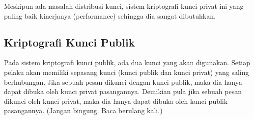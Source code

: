 Meskipun ada masalah distribusi kunci, sistem kriptografi kunci privat ini yang
paling baik kinerjanya (performance) sehingga dia sangat dibutuhkan.


\subsection{Kriptografi Kunci Publik}
Pada sistem kriptografi kunci publik, ada dua kunci yang akan digunakan. Setiap
pelaku akan memiliki sepasang kunci (kunci publik dan kunci privat) yang saling
berhubungan. Jika sebuah pesan dikunci dengan kunci publik, maka dia hanya
dapat dibuka oleh kunci privat pasangannya. Demikian pula jika sebuah pesan
dikunci oleh kunci privat, maka dia hanya dapat dibuka oleh kunci publik
pasangannya. (Jangan bingung. Baca berulang kali.)
